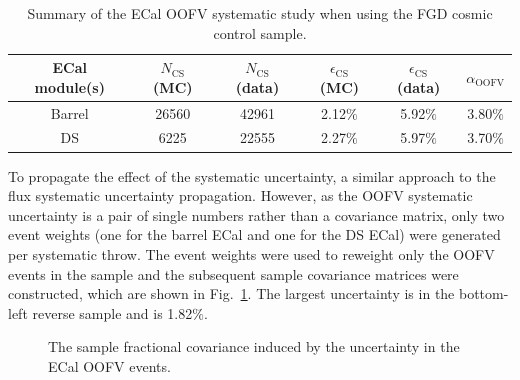 \begin{table}
  \begin{tabular}{ c c c c c c }
    ECal module(s) & $N_{\textrm{CS}}$ (MC) & $N_{\textrm{CS}}$ (data) & $\epsilon_{\textrm{CS}}$ (MC) & $\epsilon_{\textrm{CS}}$ (data) & $\alpha_{\textrm{OOFV}}$ \\ \hline \hline
    Barrel & 26560 & 42961 & 2.12$\%$ & 5.92$\%$ & 3.80$\%$ \\
    DS & 6225 & 22555 & 2.27$\%$ & 5.97$\%$ & 3.70$\%$ \\
  \end{tabular}
  \caption{Summary of the ECal OOFV systematic study when using the FGD cosmic control sample.}
  \label{table:OOFVSystematicSummary}
\end{table}
\newline
\newline
To propagate the effect of the systematic uncertainty, a similar approach to the flux systematic uncertainty propagation.  However, as the OOFV systematic uncertainty is a pair of single numbers rather than a covariance matrix, only two event weights (one for the barrel ECal and one for the DS ECal) were generated per systematic throw.  The event weights were used to reweight only the OOFV events in the sample and the subsequent sample covariance matrices were constructed, which are shown in Fig.~\ref{fig:ECalOOFVCovarianceMatrices}.  The largest uncertainty is in the bottom-left reverse sample and is 1.82$\%$.
\begin{figure}[t!]
  \centering
  \caption{The sample fractional covariance induced by the uncertainty in the ECal OOFV events.}
  \label{fig:ECalOOFVCovarianceMatrices}
\end{figure}
